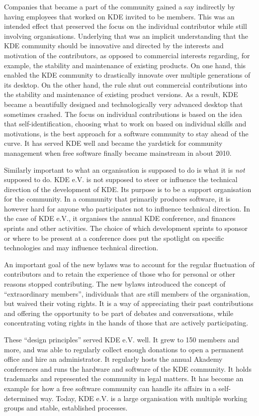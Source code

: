 Companies that became a part of the community
gained a say indirectly by having employees that worked on KDE invited
to be members. This was an intended effect that preserved the focus on
the individual contributor while still involving
organisations. Underlying that was an implicit understanding that the
KDE community should be innovative and directed by the interests and
motivation of the contributors, as opposed to commercial interests
regarding, for example, the stability and maintenance of existing
products. On one hand, this enabled the KDE community to drastically
innovate over multiple generations of its desktop. On the other hand,
the rule shut out commercial contributions into the stability and
maintenance of existing product versions. As a result, KDE became a
beautifully designed and technologically very advanced desktop that
sometimes crashed. The focus on individual contributions is based on
the idea that self-identification, choosing what to work on based on
individual skills and motivations, is the best approach for a software
community to stay ahead of the curve. It has served KDE well and
became the yardstick for community management when free software
finally became mainstream in about 2010.

Similarly important to what an organisation is supposed to do is what
it is {\em not} supposed to do. KDE e.V. is not supposed to steer or
influence the technical direction of the development of KDE. Its
purpose is to be a support organisation for the community. In a
community that primarily produces software, it is however hard for
anyone who participates not to influence technical direction. In the
case of KDE e.V., it organises the annual KDE conference, and finances
sprints and other activities. The choice of which development sprints
to sponsor or where to be present at a conference does put the
spotlight on specific technologies and may influence technical
direction. 

An important goal of the new bylaws was to account for the regular
fluctuation of contributors and to retain the experience of those who
for personal or other reasons stopped contributing. The new bylaws
introduced the concept of ``extraordinary members'', individuals that
are still members of the organisation, but waived their voting
rights. It is a way of appreciating their past contributions and
offering the opportunity to be part of debates and conversations,
while concentrating voting rights in the hands of those that are
actively participating.

These ``design principles'' served KDE e.V. well. It grew to 150
members and more, and was able to regularly collect enough donations
to open a permanent office and hire an administrator. It regularly
hosts the annual Akademy conferences and runs the hardware and
software of the KDE community. It holds trademarks and represented the
community in legal matters. It has become an example for how a free
software community can handle its affairs in a self-determined 
way. Today, KDE e.V. is a large organisation with multiple working
groups and stable, established processes.

